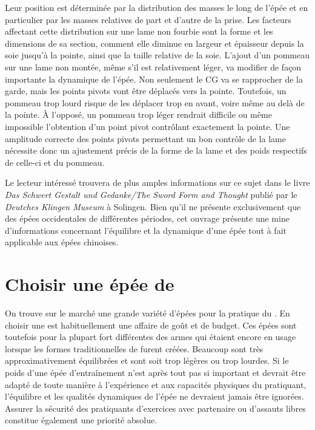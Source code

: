 Leur position est déterminée par la distribution des masses le long de l'épée et en particulier par les masses relatives de part et d'autre de la prise. Les facteurs affectant cette distribution sur une lame non fourbie sont la forme et les dimensions de sa section, comment elle diminue en largeur et épaisseur depuis la soie jusqu'à la pointe, ainsi que la taille relative de la soie. L'ajout d'un pommeau sur une lame non montée, même s'il est relativement léger, va modifier de façon importante la dynamique de l'épée. Non seulement le CG va se rapprocher de la garde, mais les points pivots vont être déplacés vers la pointe. Toutefois, un pommeau trop lourd risque de les déplacer trop en avant, voire même au delà de la pointe. \`{A} l'opposé, un pommeau trop léger rendrait difficile ou même impossible l'obtention d'un point pivot contrôlant exactement la pointe. 
Une amplitude correcte des points pivots permettant un bon contrôle de la lame nécessite donc un ajustement précis de la forme de la lame et des poids respectifs de celle-ci et du pommeau.

Le lecteur intéressé trouvera de plus amples informations sur ce sujet dans le livre \textit{Das Schwert \textendash{} Gestalt und Gedanke/The Sword \textendash{} Form and Thought} publié par le \textit{Deutches Klingen Museum} à Solingen. Bien qu'il ne présente exclusivement que des épées occidentales de différentes périodes, cet ouvrage présente une mine d'informations concernant l'équilibre et la dynamique d'une épée tout à fait applicable aux épées chinoises.

\section{Choisir une épée de \Taijijian{}}
On trouve sur le marché une grande variété d'épées pour la pratique du \Taijijian{}. En choisir une est habituellement une affaire de goût et de budget.
Ces épées sont toutefois pour la plupart fort différentes des armes qui étaient encore en usage lorsque les formes traditionnelles de \Taijijian{} furent créées.
Beaucoup sont très approximativement équilibrées et sont soit trop légères ou trop lourdes.
Si le poids d'une épée d'entraînement n'est après tout pas si important et devrait être adapté de toute manière à l'expérience et aux capacités physiques du pratiquant, l'équilibre et les qualités dynamiques de l'épée ne devraient jamais être ignorées.
Assurer la sécurité des pratiquants d'exercices avec partenaire ou d'assauts libres constitue également une priorité absolue.

